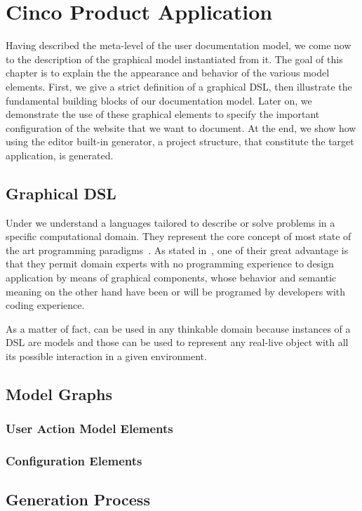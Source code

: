 \chapter{Cinco Product Application}\label{ch:CP}
Having described the meta-level of the user documentation model, we come now to the description of the graphical model instantiated from it. The goal of this chapter is to explain the the appearance and behavior of the various model elements. First, we give a strict definition of a graphical DSL, then illustrate the fundamental building blocks of our documentation model. Later on, we demonstrate the use of these graphical elements to specify the important configuration of the website that we want to document. At the end, we show how using the editor built-in generator, a project structure, that constitute the target application, is generated.

\section{Graphical DSL}\label{sec:gDSL}

Under  we understand a languages tailored to describe or solve problems in a specific computational domain. They represent the core concept of most state of the art programming paradigms~\cite{perez-et_al}. As stated in~\cite{Naujokat2018}, one of their great advantage is that they permit domain experts with no programming experience to design application by means of graphical components, whose behavior and semantic meaning on the other hand have been or will be programed by developers with coding experience.

As a matter of fact,  can be used in any thinkable domain because instances of a DSL are models and those can be used to represent any real-live object with all its possible interaction in a given environment.

\section{Model Graphs}\label{sec:ModElem}


\subsection{User Action Model Elements}\label{sec:FuncElem}


\subsection{Configuration Elements}\label{sec:ConfElem}


\section{Generation Process}\label{sec:GenProcess}

